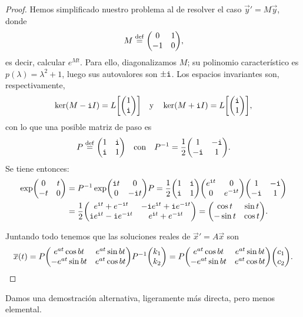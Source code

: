 \documentclass[../ecuaciones_diferenciales.tex]{subfiles}
\begin{document}
\begin{proof}
	Hemos simplificado nuestro problema al de resolver el caso 
	\(\vec{y}' = M\vec{y}\), donde
	\[M \eqdef \mat{0 & 1 \\ -1 & 0},\]
	es decir, calcular \(e^{Mt}\).
	Para ello, diagonalizamos \(M\); su polinomio característico es 
	\(p(\lambda) = \lambda^2 + 1\), luego sus
	autovalores son \(\pm \mathtt{i}\). Los espacios invariantes son, respectivamente,
	\[\ker(M - \iu I) = L\left[\mat{1 \\ \iu}\right] 
		\quad \text{y} \quad 
		\ker(M + \iu I) = L\left[\mat{\iu \\ 1}\right],\]
	con lo que una posible matriz de paso es 
	\[P \eqdef \mat{1 & \iu \\ \iu & 1} \quad \text{con} \quad 
		P^{-1} = \frac{1}{2} \mat{1 & -\iu \\ -\iu & 1}.\]
	Se tiene entonces:
	\begin{align*}
		\exp \mat{0 & t \\ -t & 0} &= P^{-1} \exp\mat{\iu t & 0 \\ 0 & -\iu t} P =
		\frac{1}{2} \mat{1 & \iu \\ \iu & 1}
		\mat{e^{\iu t} & 0 \\ 0 & e^{-\iu t}} \mat {1 & -\iu \\ -\iu & 1} \\
		&= \frac{1}{2} 
		\mat{e^{\iu t} + e^{-\iu t} & -\iu e^{\iu t} + \iu e^{-\iu t} \\
		\iu e^{\iu t} - \iu e^{-\iu t} & e^{\iu t} + e^{-\iu t}} 
		= \mat{\cos t & \sin t \\ -\sin t & \cos t}.
	\end{align*}

	Juntando todo tenemos que las soluciones reales de \(\vec{x}' = A\vec{x}\) 
	son
	\[\vec{x}(t) = P 
		\mat{e^{at}\cos bt & e^{at}\sin bt \\
			-e^{at} \sin bt & e^{at} \cos bt} P^{-1} 
		\mat{k_1 \\ k_2} 
		= P \mat{e^{at}\cos bt & e^{at}\sin bt \\
			-e^{at} \sin bt & e^{at} \cos bt} \mat {c_1 \\ c_2}.\]
\end{proof}

Damos una demostración alternativa, ligeramente más directa, pero menos 
elemental.
\end{document}
